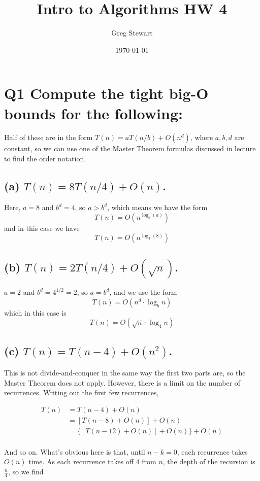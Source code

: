 \documentclass{article}
\title{Intro to Algorithms HW 4}
\author{Greg Stewart}
\date{\today}
\begin{document}
\maketitle

\section*{Q1 \normalsize Compute the tight big-O bounds for the following: }

Half of these are in the form $T(n) = aT(n/b) + O(n^d)$, where $a,b,d$ are constant, so we can use one of the Master Theorem formulas discussed in lecture to find the order notation.

\subsection*{(a) \normalsize $T(n) = 8T(n/4) + O(n)$.}
Here, $a = 8$ and $b^d = 4$, so $a > b^d$, which means we have the form $$T(n) = O(n^{\log_b (a)})$$and in this case we have $$T(n) = O(n^{\log_{4} (8)})$$

\subsection*{(b) \normalsize $T(n) = 2T(n/4) + O(\sqrt{n})$.}
$a = 2$ and $b^d = 4 ^{1/2} = 2$, so $a = b^d$, and we use the form $$T(n) = O(n^d \cdot \log_b n)$$ which in this case is
$$T(n) = O(\sqrt{n} \cdot \log_4 n)$$

\subsection*{(c) \normalsize $T(n) = T(n-4) + O(n^2)$.}

This is not divide-and-conquer in the same way the first two parts are, so the Master Theorem does not apply. However, there is a limit on the number of recurrences. Writing out the first few recurrences,

\begin{align*}
  T(n) &= T(n-4) + O(n) \\
  &= [T(n-8) + O(n)] + O(n) \\
  &= \{[T(n-12) + O(n)] + O(n) \} + O(n) \\
\end{align*}

And so on. What's obvious here is that, until $n-k = 0$, each recurrence takes $O(n)$ time. As each recurrence takes off $4$ from $n$, the depth of the recursion is $\frac{n}{4}$, so we find
\end{document}
